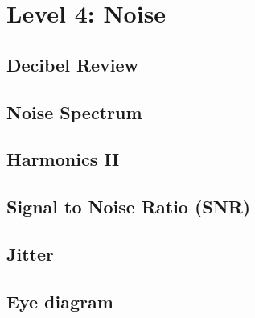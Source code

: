 
\section{Level 4: Noise}
\subsection{Decibel Review}

\subsection{Noise Spectrum}

\subsection{Harmonics II}

\subsection{Signal to Noise Ratio (SNR)}

\subsection{Jitter}


\subsection{Eye diagram}
